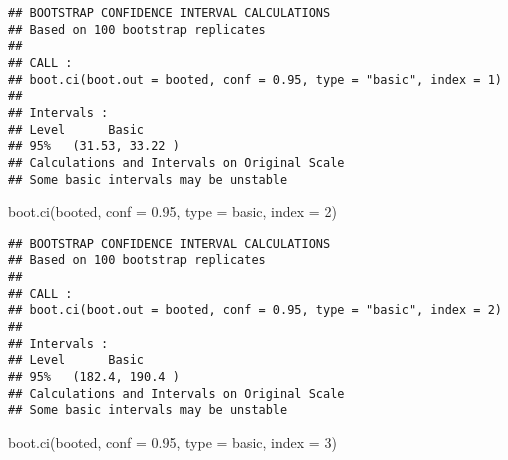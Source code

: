\documentclass[
]{book}
\newenvironment{Shaded}{\begin{snugshade}}{\end{snugshade}}
\newcommand{\AttributeTok}[1]{\textcolor[rgb]{0.77,0.63,0.00}{#1}}
\newcommand{\ControlFlowTok}[1]{\textcolor[rgb]{0.13,0.29,0.53}{\textbf{#1}}}
\newcommand{\DecValTok}[1]{\textcolor[rgb]{0.00,0.00,0.81}{#1}}
\newcommand{\FloatTok}[1]{\textcolor[rgb]{0.00,0.00,0.81}{#1}}
\newcommand{\FunctionTok}[1]{\textcolor[rgb]{0.00,0.00,0.00}{#1}}
\newcommand{\NormalTok}[1]{#1}
\newcommand{\OtherTok}[1]{\textcolor[rgb]{0.56,0.35,0.01}{#1}}
\newcommand{\SpecialCharTok}[1]{\textcolor[rgb]{0.00,0.00,0.00}{#1}}
\newcommand{\StringTok}[1]{\textcolor[rgb]{0.31,0.60,0.02}{#1}}
\begin{document}
\begin{Shaded}
\end{Shaded}

\begin{verbatim}
## BOOTSTRAP CONFIDENCE INTERVAL CALCULATIONS
## Based on 100 bootstrap replicates
## 
## CALL : 
## boot.ci(boot.out = booted, conf = 0.95, type = "basic", index = 1)
## 
## Intervals : 
## Level      Basic         
## 95%   (31.53, 33.22 )  
## Calculations and Intervals on Original Scale
## Some basic intervals may be unstable
\end{verbatim}

\begin{Shaded}
\begin{Highlighting}[]
\FunctionTok{boot.ci}\NormalTok{(booted, }\AttributeTok{conf =} \FloatTok{0.95}\NormalTok{, }\AttributeTok{type =} \StringTok{\textquotesingle{}basic\textquotesingle{}}\NormalTok{, }\AttributeTok{index =} \DecValTok{2}\NormalTok{)}
\end{Highlighting}
\end{Shaded}

\begin{verbatim}
## BOOTSTRAP CONFIDENCE INTERVAL CALCULATIONS
## Based on 100 bootstrap replicates
## 
## CALL : 
## boot.ci(boot.out = booted, conf = 0.95, type = "basic", index = 2)
## 
## Intervals : 
## Level      Basic         
## 95%   (182.4, 190.4 )  
## Calculations and Intervals on Original Scale
## Some basic intervals may be unstable
\end{verbatim}

\begin{Shaded}
\begin{Highlighting}[]
\FunctionTok{boot.ci}\NormalTok{(booted, }\AttributeTok{conf =} \FloatTok{0.95}\NormalTok{, }\AttributeTok{type =} \StringTok{\textquotesingle{}basic\textquotesingle{}}\NormalTok{, }\AttributeTok{index =} \DecValTok{3}\NormalTok{)}
\end{Highlighting}
\end{Shaded}
\end{document}
